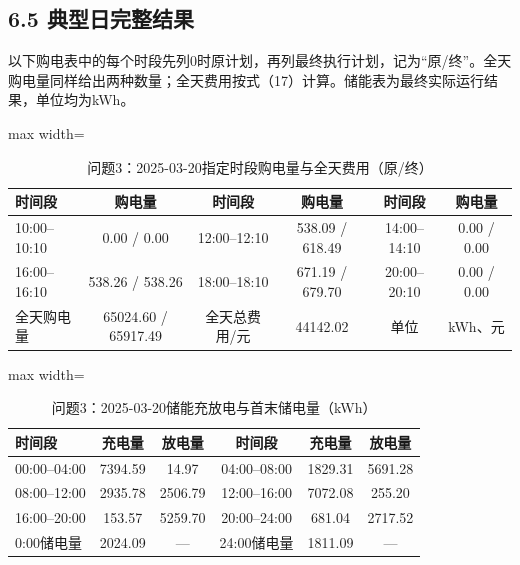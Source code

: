\documentclass[UTF8,a4paper,zihao=-4,fontset=windows]{ctexart}
\begin{document}
\subsection{6.5 典型日完整结果}
以下购电表中的每个时段先列0时原计划，再列最终执行计划，记为“原/终”。全天购电量同样给出两种数量；全天费用按式（17）计算。储能表为最终实际运行结果，单位均为kWh。
\par
\begin{table}[H]\centering\caption{问题3：2025-03-20指定时段购电量与全天费用（原/终）}
\fontsize{9.5}{12}\selectfont\setlength{\tabcolsep}{4pt}\renewcommand{\arraystretch}{1.12}
\begin{adjustbox}{max width=\linewidth}\begin{tabular}{lccccc}\toprule
时间段 & 购电量 & 时间段 & 购电量 & 时间段 & 购电量\\\midrule
10:00–10:10 & 0.00 / 0.00 & 12:00–12:10 & 538.09 / 618.49 & 14:00–14:10 & 0.00 / 0.00\\
16:00–16:10 & 538.26 / 538.26 & 18:00–18:10 & 671.19 / 679.70 & 20:00–20:10 & 0.00 / 0.00\\
全天购电量 & 65024.60 / 65917.49 & 全天总费用/元 & 44142.02 & 单位 & kWh、元\\
\bottomrule\end{tabular}\end{adjustbox}\end{table}
\begin{table}[H]\centering\caption{问题3：2025-03-20储能充放电与首末储电量（kWh）}
\fontsize{9.5}{12}\selectfont\setlength{\tabcolsep}{4pt}\renewcommand{\arraystretch}{1.12}
\begin{adjustbox}{max width=\linewidth}\begin{tabular}{lccccc}\toprule
时间段 & 充电量 & 放电量 & 时间段 & 充电量 & 放电量\\\midrule
00:00–04:00 & 7394.59 & 14.97 & 04:00–08:00 & 1829.31 & 5691.28\\
08:00–12:00 & 2935.78 & 2506.79 & 12:00–16:00 & 7072.08 & 255.20\\
16:00–20:00 & 153.57 & 5259.70 & 20:00–24:00 & 681.04 & 2717.52\\
0:00储电量 & 2024.09 & — & 24:00储电量 & 1811.09 & —\\
\bottomrule\end{tabular}\end{adjustbox}\end{table}
\end{document}
